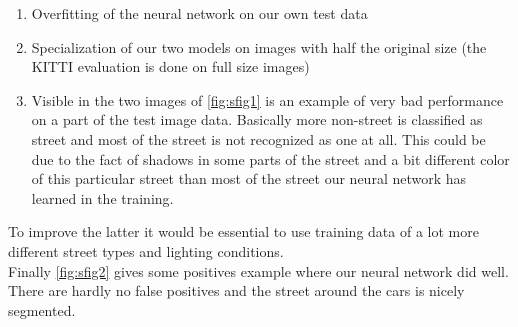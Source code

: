 \begin{enumerate}
    \item Overfitting of the neural network on our own test data
    \item Specialization of our two models on images with half the original
          size (the KITTI evaluation is done on full size images)
    \item Visible in the two images of \cref{fig:sfig1} is an example of very
          bad performance on a part of the test image data. Basically more
          non-street is classified as street and most of the street is not
          recognized as one at all. This could be due to the fact of shadows
          in some parts of the street and a bit different color of this
          particular street than most of the street our neural network has
          learned in the training.
\end{enumerate}
To improve the latter it would be essential to use training data of a lot more
different street types and lighting conditions.\\
Finally \cref{fig:sfig2} gives some positives example where our neural network
did well. There are hardly no false positives and the street around the cars is
nicely segmented.
